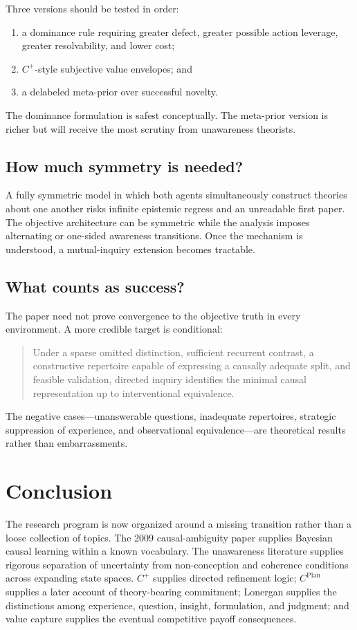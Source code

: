 \documentclass[11pt]{article}
\newcommand{\cplan}{C^{\mathrm{Plan}}}
\newcommand{\cplus}{C^{+}}
\begin{document}
	Three versions should be tested in order:
	\begin{enumerate}
		\item a dominance rule requiring greater defect, greater possible action leverage, greater resolvability, and lower cost;
		\item $\cplus$-style subjective value envelopes; and
		\item a delabeled meta-prior over successful novelty.
	\end{enumerate}
	The dominance formulation is safest conceptually.  The meta-prior version is richer but will receive the most scrutiny from unawareness theorists.
	
	\subsection{How much symmetry is needed?}
	
	A fully symmetric model in which both agents simultaneously construct theories about one another risks infinite epistemic regress and an unreadable first paper.  The objective architecture can be symmetric while the analysis imposes alternating or one-sided awareness transitions.  Once the mechanism is understood, a mutual-inquiry extension becomes tractable.
	
	\subsection{What counts as success?}
	
	The paper need not prove convergence to the objective truth in every environment.  A more credible target is conditional:
	\begin{quote}
		Under a sparse omitted distinction, sufficient recurrent contrast, a constructive repertoire capable of expressing a causally adequate split, and feasible validation, directed inquiry identifies the minimal causal representation up to interventional equivalence.
	\end{quote}
	The negative cases---unanswerable questions, inadequate repertoires, strategic suppression of experience, and observational equivalence---are theoretical results rather than embarrassments.
	
	\section{Conclusion}
	
	The research program is now organized around a missing transition rather than a loose collection of topics.  The 2009 causal-ambiguity paper supplies Bayesian causal learning within a known vocabulary.  The unawareness literature supplies rigorous separation of uncertainty from non-conception and coherence conditions across expanding state spaces.  $\cplus$ supplies directed refinement logic; $\cplan$ supplies a later account of theory-bearing commitment; Lonergan supplies the distinctions among experience, question, insight, formulation, and judgment; and value capture supplies the eventual competitive payoff consequences.
	
\end{document}
